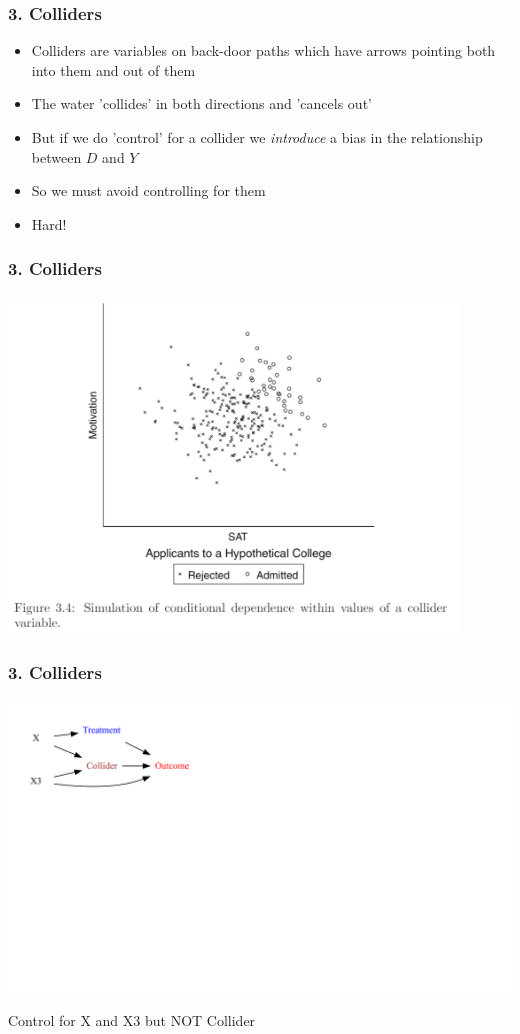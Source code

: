 \documentclass[xcolor=x11names,compress]{beamer}\usepackage[]{graphicx}\usepackage[]{color}
\newenvironment{knitrout}{}{} %
\renewcommand{\(}{\begin{columns}}
\renewcommand{\)}{\end{columns}}
\newcommand{\<}[1]{\begin{column}{#1}}
\renewcommand{\>}{\end{column}}
\begin{document}
\begin{frame}
\frametitle{3. Colliders}
\begin{itemize}
\item Colliders are variables on back-door paths which have arrows pointing both into them and out of them
\pause
\item The water 'collides' in both directions and 'cancels out'
\pause
\item But if we do 'control' for a collider we \textit{introduce} a bias in the relationship between $D$ and $Y$
\pause
\item So we must avoid controlling for them
\pause
\item Hard!
\end{itemize}
\end{frame}

\begin{frame}
\frametitle{3. Colliders}
\includegraphics[width=0.9\textwidth]{Collider.png}
\end{frame}

\begin{frame}
\frametitle{3. Colliders}
\begin{knitrout}
\color{fgcolor}
\includegraphics[width=2.7\linewidth]{figure/Dag5-1} 

\end{knitrout}
Control for X and X3 but NOT Collider
\end{frame}
\end{document}
